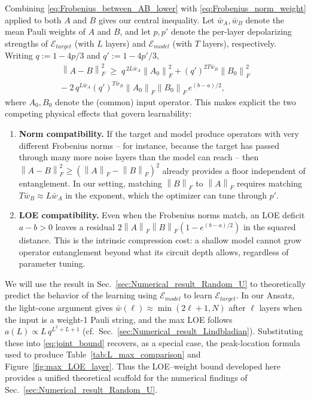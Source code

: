 \documentclass[%
 reprint,
superscriptaddress,
 amsmath,amssymb,
 aps,
]{revtex4-2}
\newcommand{\E}{\mathcal{E}}
\newcommand{\norm}[1]{\left\lVert#1\right\rVert}
\begin{document}
Combining \eqref{eq:Frobenius_between_AB_lower} with \eqref{eq:Frobenius_norm_weight} applied to both $A$ and $B$ gives our central inequality. Let $\bar w_A,\bar w_B$ denote the mean Pauli weights of $A$ and $B$, and let $p, p'$ denote the per-layer depolarizing strengths of $\E_{target}$ (with $L$ layers) and $\E_{model}$ (with $T$ layers), respectively. Writing $q := 1-4p/3$ and $q':=1-4p'/3$,
\begin{multline}
    \norm{A-B}_F^2 \;\ge\; q^{\,2L\bar w_A}\norm{A_0}_F^2 + (q')^{2T\bar w_B}\norm{B_0}_F^2\\
     -\; 2\,q^{L\bar w_A}(q')^{T\bar w_B}\norm{A_0}_F\norm{B_0}_F\,e^{(b-a)/2},
    \label{eq:joint_bound}
\end{multline}
where $A_0, B_0$ denote the (common) input operator. This makes explicit the two competing physical effects that govern learnability:

\begin{enumerate}
    \item \textbf{Norm compatibility.} If the target and model produce operators with very different Frobenius norms -- for instance, because the target has passed through many more noise layers than the model can reach -- then $\norm{A-B}_F^2\ge(\norm{A}_F-\norm{B}_F)^2$ already provides a floor independent of entanglement. In our setting, matching $\norm{B}_F$ to $\norm{A}_F$ requires matching $T\bar w_B\approx L\bar w_A$ in the exponent, which the optimizer can tune through $p'$.

    \item \textbf{LOE compatibility.} Even when the Frobenius norms match, an LOE deficit $a-b>0$ leaves a residual $2\norm{A}_F\norm{B}_F(1-e^{(b-a)/2})$ in the squared distance. This is the intrinsic compression cost: a shallow model cannot grow operator entanglement beyond what its circuit depth allows, regardless of parameter tuning.
\end{enumerate}

We will use the result in Sec.~\ref{sec:Numerical_result_Random_U} to theoretically predict the behavior of the learning using $\E_{model}$ to learn $\E_{target}$. In our Ansatz, the light-cone argument gives $\bar w(\ell)\approx \min(2\ell+1,N)$ after $\ell$ layers when the input is a weight-1 Pauli string, and the max LOE follows $a(L)\propto L\,q^{L^2+L+1}$ (cf.\ Sec.~\ref{sec:Numerical_result_Lindbladian}). Substituting these into \eqref{eq:joint_bound} recovers, as a special case, the peak-location formula used to produce Table~\ref{tab:L_max_comparison} and Figure~\ref{fig:max_LOE_layer}. Thus the LOE--weight bound developed here provides a unified theoretical scaffold for the numerical findings of Sec.~\ref{sec:Numerical_result_Random_U}.
\end{document}
